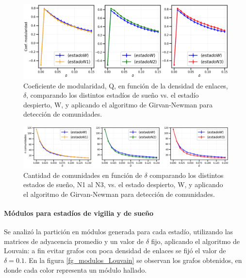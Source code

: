 \documentclass{article}
\begin{document}
\begin{figure}[!htb]
	\centering
	\includegraphics[width= 0.9\linewidth]{fg/coef_modularidad_W_vs_Ni_GN.png}
	\caption{Coeficiente de modularidad, Q, en función de la densidad de enlaces, $\delta$, comparando los distintos estadíos de sueño vs. el estadío despierto, W, y aplicando el algoritmo de Girvan-Newman para detección de comunidades.
	}
	\label{coef_modularidad_W_vs_Ni_GN}
\end{figure}
 
\begin{figure}[!htb]
	\centering
	\includegraphics[width= 0.9\linewidth]{fg/num_comunidades_W_vs_Ni_GN.png}
	\caption{Cantidad de comunidades en función de $\delta$ comparando los distintos estados de sueño, N1 al N3, vs. el estado despierto, W, y aplicando el algoritmo de Girvan-Newman para detección de comunidades.
	}
	\label{num_comunidades_W_vs_Ni_GN}
\end{figure}


\paragraph{Módulos para estadíos de vigilia y de sueño}
Se analizó la partición en módulos generada para cada estadío, utilizando las matrices de adyacencia promedio y un valor de $\delta$ fijo, aplicando el algoritmo de Louvain: a fin evitar grafos con poca densidad de enlaces se fijó el valor de $\delta = 0.1$. 
En la figura \ref{fg_modulos_Louvain} se observan los grafos obtenidos, en donde cada color representa un módulo hallado.
\end{document}
